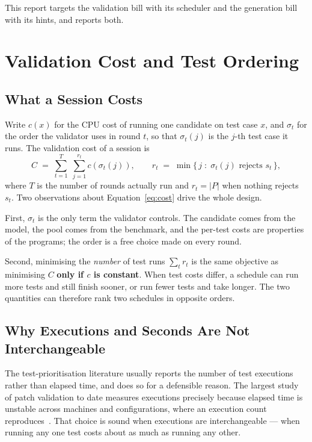 This report targets the validation bill with its scheduler and the generation
bill with its hints, and reports both.

\section{Validation Cost and Test Ordering}
\label{sec:bg-cost}

\subsection{What a Session Costs}

Write $c(x)$ for the CPU cost of running one candidate on test case $x$, and
$\sigma_t$ for the order the validator uses in round $t$, so that
$\sigma_t(j)$ is the $j$-th test case it runs. The validation cost of a session
is
\begin{equation}
C \;=\; \sum_{t=1}^{T} \; \sum_{j=1}^{r_t} c\!\left(\sigma_t(j)\right),
\qquad
r_t \;=\; \min\{\, j \;:\; \sigma_t(j) \text{ rejects } s_t \,\},
\label{eq:cost}
\end{equation}
where $T$ is the number of rounds actually run and $r_t = |P|$ when nothing
rejects $s_t$. Two observations about Equation~\eqref{eq:cost} drive the whole
design.

First, $\sigma_t$ is the only term the validator controls. The candidate comes
from the model, the pool comes from the benchmark, and the per-test costs are
properties of the programs; the order is a free choice made on every round.

Second, minimising the \emph{number} of test runs $\sum_t r_t$ is the same
objective as minimising $C$ \textbf{only if $c$ is constant}. When test costs
differ, a schedule can run more tests and still finish sooner, or run fewer
tests and take longer. The two quantities can therefore rank two schedules in
opposite orders.

\subsection{Why Executions and Seconds Are Not Interchangeable}

The test-prioritisation literature usually reports the number of test
executions rather than elapsed time, and does so for a defensible reason. The
largest study of patch validation to date measures executions precisely because
elapsed time is unstable across machines and configurations, where an execution
count reproduces~\citep{lou2024aprregression}. That choice is sound when
executions are interchangeable --- when running any one test costs about as
much as running any other.

